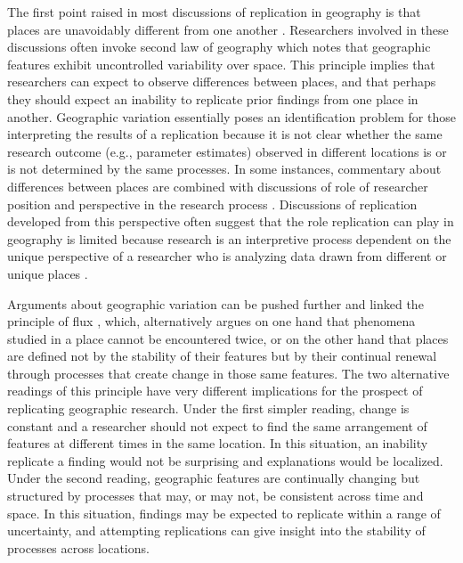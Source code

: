 \documentclass[]{interact}
\theoremstyle{plain}%
\theoremstyle{definition}
\theoremstyle{remark}
\begin{document}
The first point raised in most discussions of replication in geography is that places are unavoidably different from one another \citep[see][]{goodchild2021Annals, goodchild2022reproducibility, Wainwright2021}.
Researchers involved in these discussions often invoke \cite{anselin1989special} second law of geography which notes that geographic features exhibit uncontrolled variability over space. 
This principle implies that researchers can expect to observe differences between places, and that perhaps they should expect an inability to replicate prior findings from one place in another.
Geographic variation essentially poses an identification problem for those interpreting the results of a replication because it is not clear whether the same research outcome (e.g., parameter estimates) observed in different locations is or is not determined by the same processes.  
In some instances, commentary about differences between places are combined  with discussions of role of researcher position and perspective in the research process \citep{Peet1999, simandan2019revisiting}. 
Discussions of replication developed from this perspective often suggest that the role replication can play in geography is limited because research is an interpretive process dependent on the unique perspective of a researcher who is analyzing data drawn from different or unique places \citep{Wainwright2021}. 

Arguments about geographic variation can be pushed further and linked the principle of flux \citep{marcovich1967}, which, alternatively argues on one hand that phenomena studied in a place cannot be encountered twice, or on the other hand that places are defined not by the stability of their features but by their continual renewal through processes that create change in those same features. 
The two alternative readings of this principle have very different implications for the prospect of replicating geographic research.
Under the first simpler reading, change is constant and a researcher should not expect to find the same arrangement of features at different times in the same location.
In this situation, an inability replicate a finding would not be surprising and explanations would be localized. 
Under the second reading, geographic features are continually changing but structured by processes that may, or may not, be consistent across time and space. 
In this situation, findings may be expected to replicate within a range of uncertainty, and attempting replications can give insight into the stability of processes across locations. 
\end{document}
